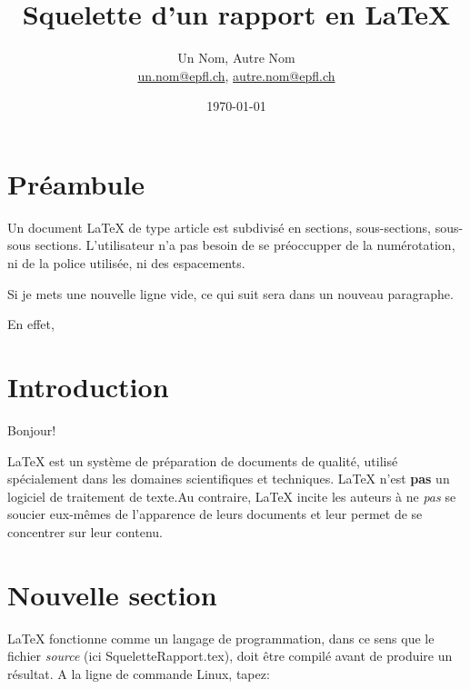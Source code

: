 \documentclass[a4paper,12pt,twoside]{article}
\newcommand{\mail}[1]{{\href{mailto:#1}{#1}}}
\begin{document}
\title{Squelette d'un rapport en \LaTeX}
\author{Un Nom, Autre Nom\\  %
{\small \mail{un.nom@epfl.ch}, \mail{autre.nom@epfl.ch}}}
\date{\today}\maketitle
\tableofcontents %

\baselineskip=16pt
\parindent=0pt
\parskip=12pt

\section{Préambule}

Un document             \LaTeX{} de type article est subdivis\'e en sections, sous-sections, sous-sous sections.                               
L'utilisateur n'a pas 
besoin de se pr\'eoccupper 
de la  num\'erotation, ni de la police utilis\'ee, ni des espacements.

Si je mets une nouvelle ligne vide, ce qui suit sera dans un nouveau paragraphe.

En effet, 


\section{Introduction} %

Bonjour!

\LaTeX{} est un syst\`eme de pr\'eparation de documents de qualit\'e, utilis\'e sp\'ecialement dans les domaines scientifiques et techniques. \LaTeX{} n'est \textbf{pas} un logiciel de traitement de texte.Au contraire, \LaTeX{} incite les auteurs \`a ne \textit{pas} se soucier eux-m\^emes de l'apparence de leurs documents et leur permet de se concentrer sur leur contenu. 

\section{Nouvelle section} %

\LaTeX{} fonctionne comme un langage de programmation, dans ce sens que le fichier \textit{source} (ici SqueletteRapport.tex), doit \^etre compil\'e avant de produire un r\'esultat. A la ligne de commande Linux, tapez:
\end{document}

